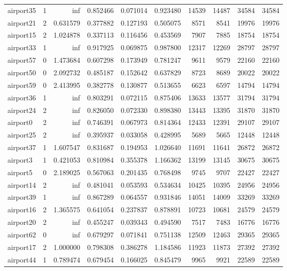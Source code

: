 \begin{longtable}{|l|r|r|r|r|r|r|r|r|r|}
airport35 & 1 & inf & 0.852466 & 0.071014 & 0.923480 & 14539 & 14487 & 34584 & 34584 \\
airport21 & 2 & 0.631579 & 0.377882 & 0.127193 & 0.505075 & 8571 & 8541 & 19976 & 19976 \\
airport15 & 2 & 1.024878 & 0.337113 & 0.116456 & 0.453569 & 7907 & 7885 & 18754 & 18754 \\
airport33 & 1 & inf & 0.917925 & 0.069875 & 0.987800 & 12317 & 12269 & 28797 & 28797 \\
airport57 & 0 & 1.473684 & 0.607298 & 0.173949 & 0.781247 & 9611 & 9579 & 22160 & 22160 \\
airport50 & 0 & 2.092732 & 0.485187 & 0.152642 & 0.637829 & 8723 & 8689 & 20022 & 20022 \\
airport59 & 0 & 2.413995 & 0.382778 & 0.130877 & 0.513655 & 6623 & 6597 & 14794 & 14794 \\
airport36 & 1 & inf & 0.803291 & 0.072115 & 0.875406 & 13633 & 13577 & 31794 & 31794 \\
airport24 & 2 & inf & 0.826050 & 0.072330 & 0.898380 & 13443 & 13395 & 31870 & 31870 \\
airport0 & 2 & inf & 0.746391 & 0.067973 & 0.814364 & 12433 & 12391 & 29107 & 29107 \\
airport25 & 2 & inf & 0.395937 & 0.033058 & 0.428995 & 5689 & 5665 & 12448 & 12448 \\
airport37 & 1 & 1.607547 & 0.831687 & 0.194953 & 1.026640 & 11691 & 11641 & 26872 & 26872 \\
airport3 & 1 & 0.421053 & 0.810984 & 0.355378 & 1.166362 & 13199 & 13145 & 30675 & 30675 \\
airport5 & 0 & 2.189025 & 0.567063 & 0.201435 & 0.768498 & 9745 & 9707 & 22427 & 22427 \\
airport14 & 2 & inf & 0.481041 & 0.053593 & 0.534634 & 10425 & 10395 & 24956 & 24956 \\
airport39 & 1 & inf & 0.867289 & 0.064557 & 0.931846 & 14051 & 14009 & 33269 & 33269 \\
airport16 & 2 & 1.365575 & 0.641054 & 0.237837 & 0.878891 & 10723 & 10681 & 24579 & 24579 \\
airport20 & 2 & inf & 0.455247 & 0.039343 & 0.494590 & 7517 & 7483 & 16776 & 16776 \\
airport62 & 0 & inf & 0.679297 & 0.071841 & 0.751138 & 12509 & 12463 & 29365 & 29365 \\
airport17 & 2 & 1.000000 & 0.798308 & 0.386278 & 1.184586 & 11923 & 11873 & 27392 & 27392 \\
airport44 & 1 & 0.789474 & 0.679454 & 0.166025 & 0.845479 & 9965 & 9921 & 22589 & 22589 \\

\end{longtable}
